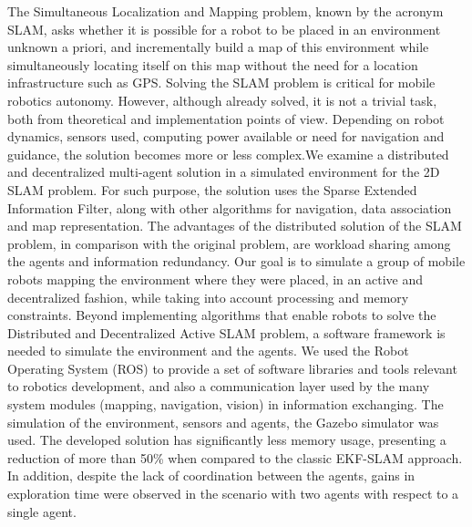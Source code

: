 The Simultaneous Localization and Mapping problem, known by the acronym SLAM, asks whether it is possible for a robot to be placed in an environment
unknown a priori, and incrementally build a map of this
environment while simultaneously locating itself on this map without the
need for a location infrastructure such as GPS.
Solving the SLAM problem is critical for mobile robotics
autonomy. However, although already solved, it is not a trivial task,
both from theoretical and implementation points of view.
Depending on robot dynamics, sensors used, computing power available or need for navigation and guidance, the solution
becomes more or less complex.We examine a distributed and decentralized multi-agent solution in a simulated environment
for the 2D SLAM problem. For such purpose, the solution uses the Sparse Extended Information Filter, along with other algorithms for navigation,
data association and map representation. The advantages of the distributed solution of the
SLAM problem, in comparison with the original problem, are workload sharing
among the agents and information redundancy. Our goal is to simulate a 
group of mobile robots mapping the environment where they were placed, 
in an active and decentralized fashion, while taking into account 
processing and memory constraints.
Beyond implementing algorithms that enable robots to solve the 
Distributed and Decentralized Active SLAM problem, a software framework is needed to simulate the environment and the agents. We used the Robot Operating System (ROS) to provide a set of software libraries and tools relevant to robotics 
development, and also a communication layer used by the many system 
modules (mapping, navigation, vision) in information exchanging. The 
simulation of the environment, sensors and agents, the Gazebo simulator 
was used.
The developed solution has significantly less memory usage,
presenting a reduction of more than 50\% when compared to the classic EKF-SLAM approach.
In addition, despite the lack of coordination between the agents,
gains in exploration time were observed in the scenario with two agents with respect to a single agent.
